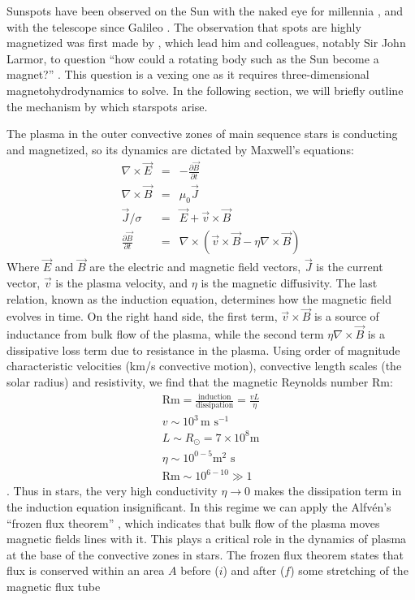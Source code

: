 Sunspots have been observed on the Sun with the naked eye for millennia \citep{Hayakawa2017}, and with the telescope since Galileo \citep{Galilei1613}. The observation that spots are highly magnetized was first made by \citet{Hale1908}, which lead him and colleagues, notably Sir John Larmor, to question ``how could a rotating body such as the Sun become a magnet?'' \citep{Larmor1919}. This question is a vexing one as it requires three-dimensional magnetohydrodynamics to solve. In the following section, we will briefly outline the mechanism by which starspots arise. 

The plasma in the outer convective zones of main sequence stars is conducting and magnetized, so its dynamics are dictated by Maxwell's equations: 
\begin{eqnarray}
\nabla \times \vec{E} &=& -\frac{\partial \vec{B}}{\partial t}\\
\nabla \times \vec{B} &=& \mu_0 \vec{J}\\
\vec{J}/\sigma &=& \vec{E} + \vec{v} \times \vec{B}\\
\frac{\partial \vec{B}}{\partial t} &=& \nabla \times \left( \vec{v} \times \vec{B} - \eta \nabla \times \vec{B} \right)
\end{eqnarray}
Where $\vec{E}$ and $\vec{B}$ are the electric and magnetic field vectors, $\vec{J}$ is the current vector, $\vec{v}$ is the plasma velocity, and $\eta$ is the magnetic diffusivity. The last relation, known as the induction equation, determines how the magnetic field evolves in time. On the right hand side, the first term, $\vec{v} \times \vec{B}$ is a source of inductance from bulk flow of the plasma, while the second term $\eta \nabla \times \vec{B}$ is a dissipative loss term due to resistance in the plasma. Using order of magnitude characteristic velocities (km/s convective motion), convective length scales (the solar radius) and resistivity, we find that the magnetic Reynolds number Rm:
\begin{eqnarray}
\textrm{Rm} = \frac{\textrm{induction}}{\textrm{dissipation}} = \frac{v L}{\eta}\\
v \sim 10^3\, \textrm{m s}^{-1}\\
L \sim R_\odot = 7 \times 10^8 \textrm{m}\\
\eta \sim 10^{0-5} \textrm{m$^2$ s}\\
\textrm{Rm} \sim 10^{6 - 10} \gg 1
\end{eqnarray}
\citep{Ossendrijver2003}. Thus in stars, the very high conductivity $\eta \rightarrow 0$ makes the dissipation term in the induction equation insignificant. In this regime we can apply the Alfv{\'e}n's ``frozen flux theorem'' \citep{Alfven1942}, which indicates that bulk flow of the plasma moves magnetic fields lines with it. This plays a critical role in the dynamics of plasma at the base of the convective zones in stars. The frozen flux theorem states that flux is conserved within an area $A$ before ($i$) and after ($f$) some stretching of the magnetic flux tube  
